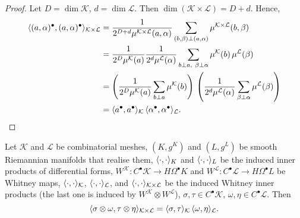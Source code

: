 \begin{proof}
  Let $D = \dim \mathcal{K}$, $d = \dim \mathcal{L}$.
  Then $\dim (\mathcal{K} \times \mathcal{L}) =  D + d$.
  Hence,
  \begin{equation}
    \begin{split}
      \langle(a, \alpha)^\bullet,(a, \alpha)^\bullet\rangle
      _{\mathcal{K} \times \mathcal{L}}
      & = \frac{1}{2^{D + d} \mu^{\mathcal{K} \times \mathcal{L}}(a, \alpha)}
          \sum_{(b, \beta) \perp (a, \alpha)}
            \mu^{\mathcal{K} \times \mathcal{L}}(b, \beta) \\
      & = \frac{1}{2^D \mu^{\mathcal{K}}(a)}
          \frac{1}{2^d \mu^{\mathcal{L}}(\alpha)}
          \sum_{b \perp a,\ \beta \perp \alpha}
            \mu^{\mathcal{K}}(b)\, \mu^{\mathcal{L}}(\beta) \\
      & = \left(
            \frac{1}{2^D \mu^{\mathcal{K}}(a)}
            \sum_{b \perp a} \mu^{\mathcal{K}}(b)
          \right)\,
          \left(
            \frac{1}{2^d \mu^{\mathcal{L}}(\alpha)}
            \sum_{\beta \perp \alpha} \mu^{\mathcal{L}}(\beta)
          \right) \\
      & = \langle a^\bullet,a^\bullet\rangle_{\mathcal{K}}\,
          \langle\alpha^\bullet,\alpha^\bullet\rangle_{\mathcal{L}}.
    \end{split}
  \end{equation}
\end{proof}
\begin{proposition}
  Let
    $\mathcal{K}$ and $\mathcal{L}$ be combinatorial meshes,
    $(K, g^K)$ and $(L, g^L)$ be smooth Riemannian manifolds that realise them,
    $\langle\cdot,\cdot\rangle_K$ and $\langle\cdot,\cdot\rangle_L$ be the induced
      inner products of differential forms,
    $W^\mathcal{K} \colon C^\bullet \mathcal{K} \to H \Omega^\bullet K$ and
      $W^\mathcal{L} \colon C^\bullet \mathcal{L} \to H \Omega^\bullet L$
      be Whitney maps,
    $\langle\cdot,\cdot\rangle_{\mathcal{K}}$, $\langle\cdot,\cdot\rangle_{\mathcal{L}}$,
      and $\langle\cdot,\cdot\rangle_{\mathcal{K} \times \mathcal{L}}$
      be the induced Whitney inner products
      (the last one is induced by $W^\mathcal{K} \otimes W^\mathcal{L}$),
    $\sigma, \tau \in C^\bullet \mathcal{K}$,
    $\omega, \eta \in C^\bullet \mathcal{L}$.
  Then
  \begin{equation}
    \langle\sigma \otimes \omega,\tau \otimes \eta\rangle
    _{\mathcal{K} \times \mathcal{L}}
    = \langle\sigma,\tau\rangle_{\mathcal{K}}\, \langle\omega,\eta\rangle_{\mathcal{L}}.
  \end{equation}
\end{proposition}
